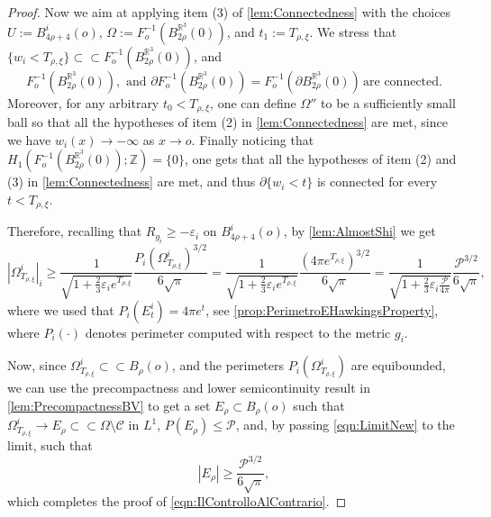 \documentclass[a4paper,12pt,reqno]{amsart}
\numberwithin{equation}{section}
\theoremstyle{plain}
\theoremstyle{definition}
\theoremstyle{remark}
\newcommand{\eps}{\varepsilon}
\begin{document}
{\begin{proof}
Now we aim at applying item (3) of \cref{lem:Connectedness} with the choices $U:= B_{4\rho+4}^i(o)$, $\Omega:=F_o^{-1}(B_{2\rho}^{\mathbb R^3}(0))$, and $t_1:=T_{\rho,\xi}$. We stress that $\{w_i< T_{\rho,\xi}\}\subset\subset F_o^{-1}(B_{2\rho}^{\mathbb R^3}(0))$, and
\[
F_o^{-1}(B_{2\rho}^{\mathbb R^3}(0)),\,\,\text{and}\,\,\partial F_o^{-1}(B_{2\rho}^{\mathbb R^3}(0)) = F_o^{-1}(\partial B_{2\rho}^{\mathbb R^3}(0))\,\text{are connected}.
\]
Moreover, for any arbitrary $t_0<T_{\rho,\xi}$, one can define $\Omega''$ to be a sufficiently small ball so that all the hypotheses of item (2) in \cref{lem:Connectedness} are met, since we have $w_i(x)\to -\infty$ as $x\to o$. 
Finally noticing that $H_1(F_o^{-1}(B_{2\rho}^{\mathbb R^3}(0));\mathbb Z)=\{0\}$, one gets that all the hypotheses of item (2) and (3) in \cref{lem:Connectedness} are met, and thus $\partial\{w_i< t\}$ is connected for every $t<T_{\rho,\xi}$.

Therefore, recalling that $R_{g_i} \ge -\eps_i$ on $B^i_{4\rho + 4}(o)$, by \cref{lem:AlmostShi} we get
\begin{equation}\label{eqn:LimitNew}
    |\Omega_{T_{\rho,\xi}}^i|_i\geq \frac{1}{\sqrt{1+\frac{2}{3}\varepsilon_i e^{T_{\rho,\xi}}}}\frac{P_i(\Omega_{T_{\rho,\xi}}^i)^{3/2}}{6\sqrt{\pi}} = \frac{1}{\sqrt{1+\frac{2}{3}\varepsilon_i e^{T_{\rho,\xi}}}}\frac{(4\pi e^{T_{\rho,\xi}})^{3/2}}{6\sqrt{\pi}} = \frac{1}{\sqrt{1+\frac{2}{3}\varepsilon_i \frac{\mathscr{P}}{4\pi}}}\frac{\mathscr{P}^{3/2}}{6\sqrt{\pi}},
    \end{equation}
    where we used that $P_i(E_t^i)=4\pi e^t$, see \cref{prop:PerimetroEHawkingsProperty}, where $P_i(\cdot)$ denotes perimeter computed with respect to the metric $g_i$.

    Now, since $\Omega^i_{T_{\rho,\xi}}\subset\subset B_\rho(o)$, and the perimeters $P_i(\Omega^i_{T_{\rho,\xi}})$ are equibounded, we can use the precompactness and lower semicontinuity result in \cref{lem:PrecompactnessBV} to get a set $E_\rho\subset B_\rho(o)$ such that $\Omega^i_{T_{\rho,\xi}}\to E_\rho\subset\subset \Omega\setminus \mathcal{C}$ in $L^1$, $P(E_\rho)\leq \mathscr{P}$, and, by passing \eqref{eqn:LimitNew} to the limit, such that
    \begin{equation}\label{eqn:IlControlloDentro}
    |E_\rho|\geq \frac{\mathscr{P}^{3/2}}{6\sqrt{\pi}},
    \end{equation}
    which completes the proof of \eqref{eqn:IlControlloAlContrario}. 
    

\end{proof}}
\end{document}
